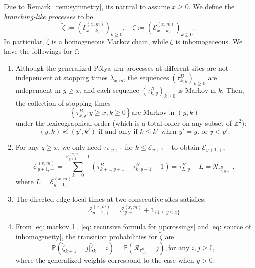 \documentclass[twoside,12pt,a4paper]{article}
\numberwithin{equation}{section}
\begin{document}
	Due to Remark~\ref{rem:symmetry}, its natural to assume $x \ge 0$. We define the \textit{branching-like processes} to be
	\[
	\tilde{\zeta} := \left(\mathcal{E}^{(x,m)}_{x+k,+} \right)_{k\geq 0}, \quad
	\zeta := \left(\mathcal{E}^{(x,m)}_{x-k,-} \right)_{k\geq 0}
	.\]
	In particular, $\tilde{\zeta}$ is a homogeneous Markov chain, while $\zeta$ is inhomogeneous. We have the followings for 	$\tilde{\zeta}$:
	\begin{enumerate}
		\item Although the generalized P\'{o}lya urn processes at different sites are not independent at stopping times $\lambda_{x,m}$, the sequences $(\tau^B_{k,y})_{k\geq 0} $ are independent in $y \geq x$, and each sequence $\left(\tau^B_{k,y}\right)_{k\geq 0} $ is Markov in $k$. Then, the collection of stopping times  
		\begin{equation}\label{eq: markov 1} 
			\left\{\tau^B_{k,y}: y\geq x, k\geq 0 \right\} \mbox{are Markov in $(y,k)$}
		\end{equation}
		under the lexicographical order (which is a total order on any subset of $\mathbb{Z}^2$): 
		\begin{equation*}\label{eq: lexicographical order}
			(y,k) \preceq (y',k')  \mbox{ if and only if  }
			k \leq k'   \mbox{ when $y' = y$,  or } 
			y <y'. 
		\end{equation*} 
		
		\item For any $y\geq x$, we only need $\tau_{k,y+1}$ for $k\leq \mathcal{E}_{y+1,-}$ to obtain $\mathcal{E}_{y+1,+}$,
		\begin{equation} \label{eq: recursive formula for upcrossings}
			\mathcal{E}_{y+1,+}^{(x,m)}	=  \sum_{k= 0 }^{\mathcal{E}_{y+1,-}^{(x,m)}-1}	\left(\tau^B_{k+1,y+1}-\tau^B_{k,y+1}-1 \right) = \tau^B_{ L,y } - L = \mathcal{R}_{\tau^B_{ L,y+1 }},
		\end{equation}
		where $L = \mathcal{E}_{y+1,-}^{(x,m)}$.
		
		\item The directed edge local times at two consecutive sites satisfies:
		\begin{equation}\label{eq: source of inhomogeneity}
			\mathcal{E}_{y-1,+}^{(x,m)} = \mathcal{E}_{y,-}^{(x,m)} + \mathbb{1}_{ \{ 1\leq y \leq x \} }
		\end{equation}
		
		\item  From \eqref{eq: markov 1}, \eqref{eq: recursive formula for upcrossings} and \eqref{eq: source of inhomogeneity}, the transition probabilities for $\tilde{\zeta}$ are 
		\begin{equation}\label{eq: transition prob on positive}
			\mathbb{P}\left(\tilde{\zeta}_{k+1}=j \vert \tilde{\zeta}_k =i  \right) = 
			\mathbb{P}\left( \mathcal{R}_{\tau_{i,1}^B} = j \right), \mbox{for any $i,j\geq 0$, } 
		\end{equation} 
		where the generalized weights correspond to the case when $y>0$.
	\end{enumerate}
	
\end{document}
